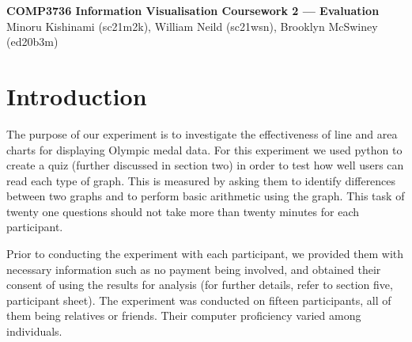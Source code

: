 
\begin{flushleft}
    \textbf{\large COMP3736 Information Visualisation Coursework 2 --- Evaluation}\\
    Minoru Kishinami (sc21m2k), William Neild (sc21wsn), Brooklyn McSwiney (ed20b3m)\\
\end{flushleft}
\section{Introduction}

\begin{flushleft}
    \quad The purpose of our experiment is to investigate the effectiveness of line and area charts for displaying Olympic medal data.
    For this experiment we used python to create a quiz (further discussed in section two) in order to test how well users can read
    each type of graph. This is measured by asking them to identify differences between two graphs and to perform basic arithmetic
    using the graph. This task of twenty one questions should not take more than twenty minutes for each participant.
    
    \quad Prior to conducting the experiment with each participant, we provided them with necessary information such as no payment being involved, and obtained their consent of using the results for analysis (for further details, refer to section five, participant sheet). The experiment was conducted on fifteen participants, all of them being relatives or friends. Their computer proficiency varied among individuals. 
\end{flushleft}



